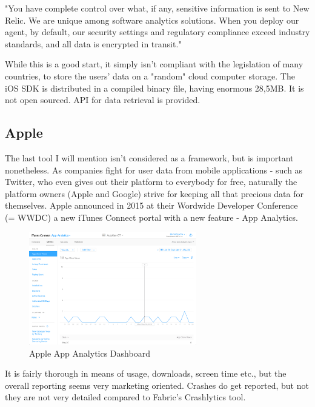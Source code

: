 "You have complete control over what, if any, sensitive information is sent to New Relic. We are unique among software analytics solutions. When you deploy our agent, by default, our security settings and regulatory compliance exceed industry standards, and all data is encrypted in transit." \cite{newrelic}

\bigbreak

While this is a good start, it simply isn't compliant with the legislation of many countries, to store the users' data on a "random" cloud computer storage. The iOS SDK is distributed in a compiled binary file, having enormous 28,5MB. It is not open sourced. API for data retrieval is provided.

\subsection{Apple}

The last tool I will mention isn't considered as a framework, but is important nonetheless. As companies fight for user data from mobile applications - such as Twitter, who even gives out their platform to everybody for free, naturally the platform owners (Apple and Google) strive for keeping all that precious data for themselves. Apple announced in 2015 at their Wordwide Developer Conference (= WWDC) a new iTunes Connect portal with a new feature - App Analytics. 

\newpage

\begin{figure}[!ht]
	\centering
	\includegraphics[width=0.65\textwidth]{figures/02_analysis/appleanalytics}
    \caption{Apple App Analytics Dashboard}
\end{figure}

It is fairly thorough in means of usage, downloads, screen time etc., but the overall reporting seems very marketing oriented. Crashes do get reported, but not they are not very detailed compared to Fabric's Crashlytics tool.

